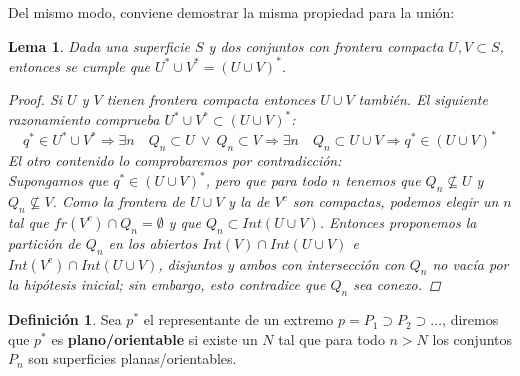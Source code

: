 \documentclass[a4paper,11pt,spanish, twoside, leqno]{tfg-uam}
\newtheorem{lema}[teor]{Lema}
\theoremstyle{definition}
\newtheorem{defin}[teor]{Definici\'on}
\begin{document}
Del mismo modo, conviene demostrar la misma propiedad para la unión:
\begin{lema}
\label{lema:unideextremos}
Dada una superficie $S$ y dos conjuntos  con frontera compacta $U,V \subset S$, entonces se cumple que $U^*\cup V^* = (U \cup V)^* $.
\begin{proof}
Si $U$ y $V$ tienen frontera compacta entonces $U\cup V$ también. El siguiente razonamiento comprueba $U^*\cup V^* \subset (U \cup V)^* $:
\[
q^* \in U^*\cup V^* \Rightarrow 
\exists n \quad Q_n \subset U \: \vee \: Q_n \subset V \Rightarrow
\exists n \quad Q_n \subset U \cup V \Rightarrow
q^* \in (U \cup V)^*
\]
El otro contenido lo comprobaremos por contradicción:\\
 Supongamos que $q^* \in (U \cup V)^*$, pero que para todo $n$ tenemos que $Q_n \nsubseteq U$ y $Q_n \nsubseteq V$. Como la frontera de $U \cup V$ y la de $V^c$ son compactas, podemos elegir un $n$ tal que $fr(V^c)\cap Q_n = \emptyset$ y que $Q_n \subset Int(U\cup V)$. Entonces proponemos  la partición de $Q_n$ en los abiertos $Int(V) \cap Int(U \cup V)$ e  $Int(V^c) \cap Int(U \cup V)$, disjuntos y ambos con intersección con $Q_n$ no vacía por la hipótesis inicial; sin embargo, esto contradice que $Q_n$ sea conexo.
\end{proof}
\end{lema}

\begin{defin}
Sea $p^*$ el representante de un extremo $p =P_1 \supset P_2 \supset \ldots$, diremos que $p^*$ es \textbf{plano/orientable} si existe un $N$ tal que para todo $n>N$ los conjuntos $P_n$ son superficies planas/orientables.
\end{defin}
\end{document}
